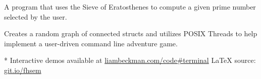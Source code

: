 A program that uses the Sieve of Eratosthenes to compute a given prime number selected by the user.

\myBreak


Creates a random graph of connected structs and utilizes POSIX Threads to help implement a user-driven command line adventure game.


\vfill
* Interactive demos available at \textcolor{my-blue}{\href{https://liambeckman.com/code\#terminal}{liambeckman.com/code\#terminal}}
\hfill\textcolor{my-red}{\LaTeX{} source: \href{https://git.io/fhsem}{git.io/fhsem}}


